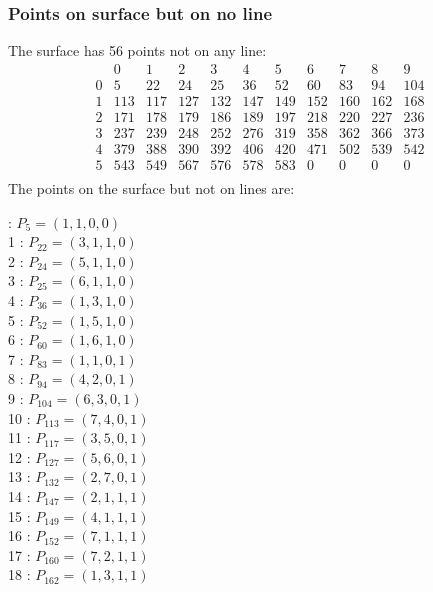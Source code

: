 \documentclass{article}
\begin{document}
{\subsubsection*{Points on surface but on no line}
The surface has 56 points not on any line:\\
$$
\begin{array}{r|*{10}{r}}
 & 0 & 1 & 2 & 3 & 4 & 5 & 6 & 7 & 8 & 9\\
\hline
0 & 5 & 22 & 24 & 25 & 36 & 52 & 60 & 83 & 94 & 104\\
1 & 113 & 117 & 127 & 132 & 147 & 149 & 152 & 160 & 162 & 168\\
2 & 171 & 178 & 179 & 186 & 189 & 197 & 218 & 220 & 227 & 236\\
3 & 237 & 239 & 248 & 252 & 276 & 319 & 358 & 362 & 366 & 373\\
4 & 379 & 388 & 390 & 392 & 406 & 420 & 471 & 502 & 539 & 542\\
5 & 543 & 549 & 567 & 576 & 578 & 583 & 0 & 0 & 0 & 0\\
\end{array}
$$
The points on the surface but not on lines are:\\
\begin{multicols}{2}
 : $P_{5}=( 1, 1, 0, 0 )$\\
1 : $P_{22}=( 3, 1, 1, 0 )$\\
2 : $P_{24}=( 5, 1, 1, 0 )$\\
3 : $P_{25}=( 6, 1, 1, 0 )$\\
4 : $P_{36}=( 1, 3, 1, 0 )$\\
5 : $P_{52}=( 1, 5, 1, 0 )$\\
6 : $P_{60}=( 1, 6, 1, 0 )$\\
7 : $P_{83}=( 1, 1, 0, 1 )$\\
8 : $P_{94}=( 4, 2, 0, 1 )$\\
9 : $P_{104}=( 6, 3, 0, 1 )$\\
10 : $P_{113}=( 7, 4, 0, 1 )$\\
11 : $P_{117}=( 3, 5, 0, 1 )$\\
12 : $P_{127}=( 5, 6, 0, 1 )$\\
13 : $P_{132}=( 2, 7, 0, 1 )$\\
14 : $P_{147}=( 2, 1, 1, 1 )$\\
15 : $P_{149}=( 4, 1, 1, 1 )$\\
16 : $P_{152}=( 7, 1, 1, 1 )$\\
17 : $P_{160}=( 7, 2, 1, 1 )$\\
18 : $P_{162}=( 1, 3, 1, 1 )$\\

\end{multicols}}
\end{document}
